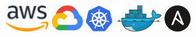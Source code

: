 \bigskip
{}
{\centering
	\includegraphics[height=10mm]{img/aws.png}
	\includegraphics[height=10mm]{img/gcp.png}
	\includegraphics[height=10mm]{img/kubernetes.png} 
	\includegraphics[height=10mm]{img/docker.png}
	\includegraphics[height=10mm]{img/ansible.png} 

	
}